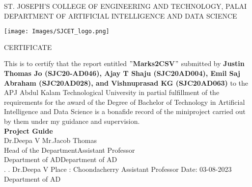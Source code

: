 \thispagestyle{empty}
\begin{center}
\normalsize{ST. JOSEPH’S COLLEGE OF ENGINEERING AND TECHNOLOGY, PALAI}\\[0.5cm]
\normalsize
 { DEPARTMENT OF ARTIFICIAL INTELLIGENCE AND DATA SCIENCE}\\[1.0cm]%
   \begin{center}
   \texttt{[image: Images/SJCET\_logo.png]}
   \end{center}
{\large CERTIFICATE}\\[1.5cm]
\end{center}
\normalsize 
This is to certify that the report entitled {\bf $"$Marks2CSV$"$} submitted by { \bf Justin Thomas Jo (SJC20-AD046), Ajay T Shaju (SJC20AD004), Emil Saj Abraham (SJC20AD028), and Vishnuprasad KG (SJC20AD063)} to the APJ Abdul Kalam Technological University in partial fulfillment of the requirements for the award of the Degree of Bachelor of Technology in Artificial Intelligence and Data Science is a bonafide record of the miniproject carried out by them under my guidance and supervision.\vspace{1.3 cm}\\
{\bf Project Guide}\hspace{8.35 cm}{\bf Project Coordinator}\\
Dr.Deepa V\hspace{9.0 cm} Mr.Jacob Thomas\\
Head of the Department\hspace{6.85 cm}Assistant Professor\hspace{2.6 cm}\\Department of AD\hspace{7.9 cm}Department of AD
\vspace{1.3 cm}\\
.\hspace{11.06 cm}{\bf Head of the Department}
\newline
.\hspace{11.01 cm} Dr.Deepa V
\newline
Place : Choondacherry  \hspace{6.87 cm} Assistant Professor
\newline
Date\hspace{0.25 cm}: 03-08-2023 \hspace{7.7 cm} Department of AD      

\newpage

